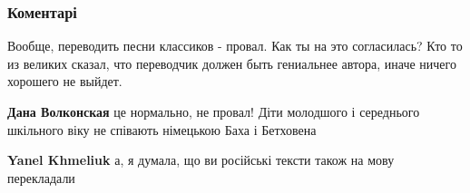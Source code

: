  
 
 
 
 
\subsubsection{Коментарі}
\label{sec:29_07_2021.fb.hmeljuk_yanel.1.nizhyn_mova_pesni_retro.cmt}

\begin{itemize}
 

Вообще, переводить песни классиков - провал. Как ты на это согласилась? Кто то
из великих сказал, что переводчик должен быть гениальнее автора, иначе ничего
хорошего не выйдет.

\begin{itemize}
 
\textbf{Дана Волконская} це нормально, не провал!
Діти молодшого і середнього шкільного віку не співають німецькою Баха і Бетховена
\begin{itemize}
 
\textbf{Yanel Khmeliuk} а, я думала, що ви російські тексти також на мову перекладали

 

\end{itemize}
\end{itemize}
\end{itemize}
